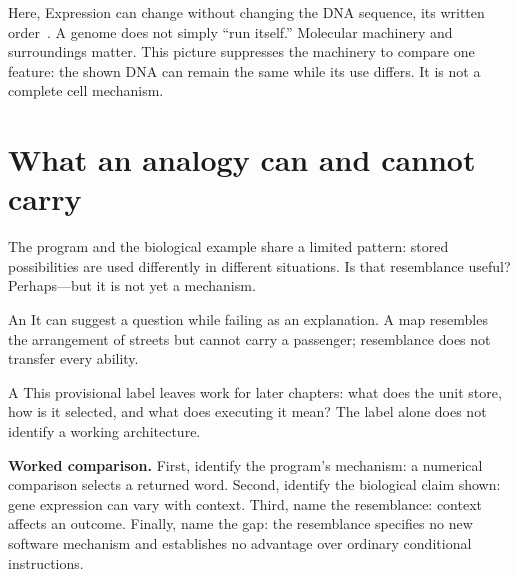  Here,  Expression can change without changing the DNA sequence, its written order~\cite{gene-control}.
A genome does not simply “run itself.” Molecular machinery and surroundings matter. This picture suppresses the machinery to compare one feature: the shown DNA can remain the same while its use differs. It is not a complete cell mechanism.

\clearpage
\section{What an analogy can and cannot carry}\label{sec:analogy}
The program and the biological example share a limited pattern: stored possibilities are used differently in different situations. Is that resemblance useful? Perhaps---but it is not yet a mechanism.

An  It can suggest a question while failing as an explanation. A map resembles the arrangement of streets but cannot carry a passenger; resemblance does not transfer every ability.

A  This provisional label leaves work for later chapters: what does the unit store, how is it selected, and what does executing it mean? The label alone does not identify a working architecture.

\textbf{Worked comparison.} First, identify the program's mechanism: a numerical comparison selects a returned word. Second, identify the biological claim shown: gene expression can vary with context. Third, name the resemblance: context affects an outcome. Finally, name the gap: the resemblance specifies no new software mechanism and establishes no advantage over ordinary conditional instructions.

